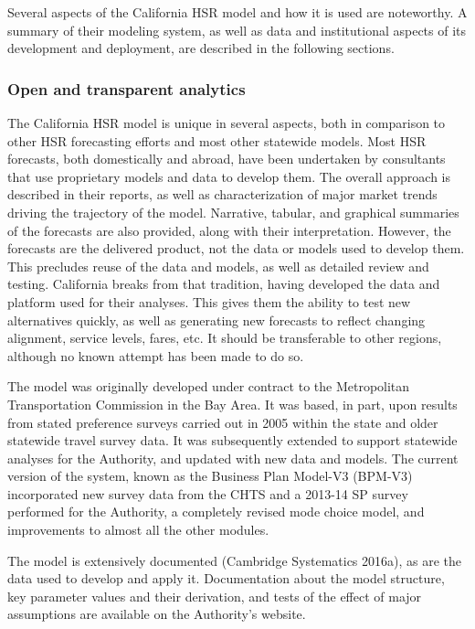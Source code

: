 Several aspects of the California HSR model and how it is used are noteworthy. A summary of their modeling system, as well as data and institutional aspects of its development and deployment, are described in the following sections.

\subsubsection{Open and transparent analytics}

The California HSR model is unique in several aspects, both in comparison to other HSR forecasting efforts and most other statewide models. Most HSR forecasts, both domestically and abroad, have been undertaken by consultants that use proprietary models and data to develop them. The overall approach is described in their reports, as well as characterization of major market trends driving the trajectory of the model. Narrative, tabular, and graphical summaries of the forecasts are also provided, along with their interpretation. However, the forecasts are the delivered product, not the data or models used to develop them. This precludes reuse of the data and models, as well as detailed review and testing. California breaks from that tradition, having developed the data and platform used for their analyses. This gives them the ability to test new alternatives quickly, as well as generating new forecasts to reflect changing alignment, service levels, fares, etc. It should be transferable to other regions, although no known attempt has been made to do so.

The model was originally developed under contract to the Metropolitan Transportation Commission in the Bay Area. It was based, in part, upon results from stated preference surveys carried out in 2005 within the state and older statewide travel survey data. It was subsequently extended to support statewide analyses for the Authority, and updated with new data and models. The current version of the system, known as the Business Plan Model-V3 (BPM-V3) incorporated new survey data from the CHTS and a 2013-14 SP survey performed for the Authority, a completely revised mode choice model, and improvements to almost all the other modules.

The model is extensively documented (Cambridge Systematics 2016a), as are the data used to develop and apply it. Documentation about the model structure, key parameter values and their derivation, and tests of the effect of major assumptions are available on the Authority's website.

